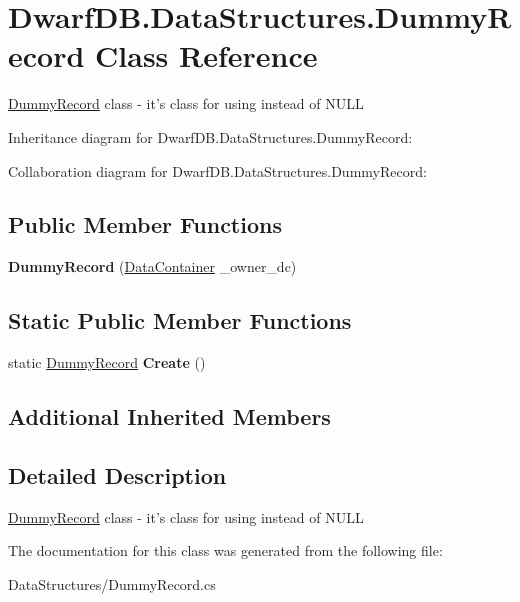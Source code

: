 \hypertarget{class_dwarf_d_b_1_1_data_structures_1_1_dummy_record}{\section{Dwarf\+D\+B.\+Data\+Structures.\+Dummy\+Record Class Reference}
\label{class_dwarf_d_b_1_1_data_structures_1_1_dummy_record}
}


\hyperlink{class_dwarf_d_b_1_1_data_structures_1_1_dummy_record}{Dummy\+Record} class -\/ it's class for using instead of N\+U\+L\+L  




Inheritance diagram for Dwarf\+D\+B.\+Data\+Structures.\+Dummy\+Record\+:


Collaboration diagram for Dwarf\+D\+B.\+Data\+Structures.\+Dummy\+Record\+:
\subsection*{Public Member Functions}
\begin{DoxyCompactItemize}
\item 
\hypertarget{class_dwarf_d_b_1_1_data_structures_1_1_dummy_record_a78c4178cf8500869469b99645050e2ec}{{\bfseries Dummy\+Record} (\hyperlink{class_dwarf_d_b_1_1_data_structures_1_1_data_container}{Data\+Container} \+\_\+owner\+\_\+dc)}\label{class_dwarf_d_b_1_1_data_structures_1_1_dummy_record_a78c4178cf8500869469b99645050e2ec}

\end{DoxyCompactItemize}
\subsection*{Static Public Member Functions}
\begin{DoxyCompactItemize}
\item 
\hypertarget{class_dwarf_d_b_1_1_data_structures_1_1_dummy_record_a8fa625aa183e039b3a7c9ca365f2b7f7}{static \hyperlink{class_dwarf_d_b_1_1_data_structures_1_1_dummy_record}{Dummy\+Record} {\bfseries Create} ()}\label{class_dwarf_d_b_1_1_data_structures_1_1_dummy_record_a8fa625aa183e039b3a7c9ca365f2b7f7}

\end{DoxyCompactItemize}
\subsection*{Additional Inherited Members}


\subsection{Detailed Description}
\hyperlink{class_dwarf_d_b_1_1_data_structures_1_1_dummy_record}{Dummy\+Record} class -\/ it's class for using instead of N\+U\+L\+L 



The documentation for this class was generated from the following file\+:\begin{DoxyCompactItemize}
\item 
Data\+Structures/Dummy\+Record.\+cs\end{DoxyCompactItemize}

